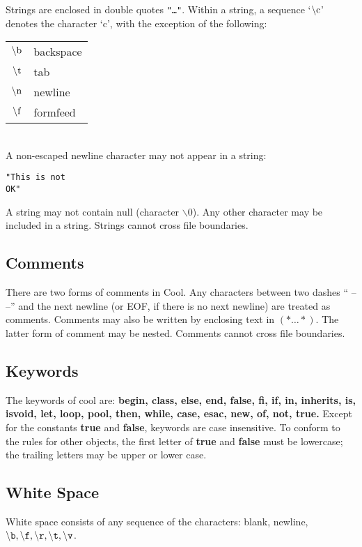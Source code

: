 Strings are enclosed in double quotes {\tt "\ldots"}.  Within a string, a
sequence `$\rm \backslash c$' denotes the character `c', with the exception of
the following: \\[.1in]
\begin{tabular}{rl}
$\rm \backslash b$ & backspace \\
$\rm \backslash t$ & tab \\
$\rm \backslash n$ & newline \\
$\rm \backslash f$ & formfeed
\end{tabular} \\[.1in]

A non-escaped newline character may not appear in a string:
\begin{verbatim}
"This is not
OK"
\end{verbatim}
A string may not contain null (character {\tt $\backslash 0$}).
Any other character may be included
in a string.
Strings cannot cross file boundaries.

\subsection{Comments}

There are two forms of comments in Cool.  Any characters between two
dashes `` -- --'' and the next newline (or EOF, if there is no next
newline) are treated as comments.  Comments may also be written by
enclosing text in $(\ast \ldots \ast )$.  The latter form of comment
may be nested.  Comments cannot cross file boundaries.

\subsection{Keywords}

The keywords of cool are:
{\bf begin, class, else, end, false, fi, if, in, inherits, is, isvoid, let, loop, 
pool, then, while, case, esac, new, of, not, true.}  Except for the constants
{\bf true} and {\bf false}, keywords are case insensitive.  To conform to
the rules for other objects, the first letter of {\bf true} and {\bf false}
must be lowercase; the trailing letters may be upper or lower case.

\subsection{White Space}

White space consists of any sequence of the characters: blank, newline, $\tt 
\backslash b, \backslash f, \backslash r, \backslash t, \backslash v$.
